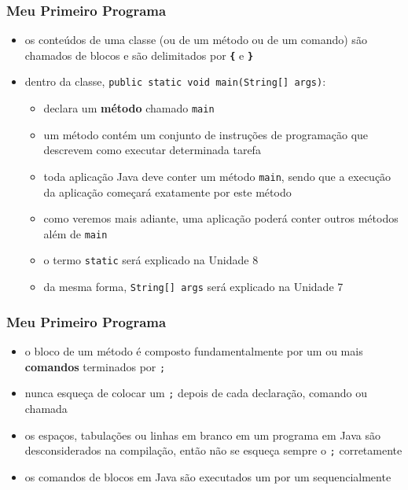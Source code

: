 \documentclass[aspectratio=169]{beamer}
\begin{document}
\begin{frame}\frametitle{Meu Primeiro Programa}
\begin{itemize}
	\item os conteúdos de uma classe (ou de um método ou de um comando) são chamados de blocos e são delimitados por \texttt{\textbf{\{}} e \texttt{\textbf{\}}}
	\item dentro da classe, \texttt{public static void main(String[] args)}:
	\begin{itemize}
		\item declara um \textbf{método} chamado \texttt{main}
		\item um método contém um conjunto de instruções de programação que descrevem como executar determinada tarefa
		\item toda aplicação Java deve conter um método \texttt{main}, sendo que a execução da aplicação começará exatamente por este método
		\item como veremos mais adiante, uma aplicação poderá conter outros métodos além de \texttt{main}
		\item o termo \texttt{static} será explicado na Unidade 8
		\item da mesma forma, \texttt{String[] args} será explicado na Unidade 7
	\end{itemize}
\end{itemize}
\end{frame}

\begin{frame}\frametitle{Meu Primeiro Programa}
\begin{itemize}
	\item o bloco de um método é composto fundamentalmente por um ou mais \textbf{comandos} terminados por \texttt{;}
	\item nunca esqueça de colocar um \texttt{;} depois de cada declaração, comando ou chamada
	\item os espaços, tabulações ou linhas em branco em um programa em Java são desconsiderados na compilação, então não se esqueça sempre o \texttt{;} corretamente
	\item os comandos de blocos em Java são executados um por um sequencialmente
\end{itemize}
\end{frame}
\end{document}
